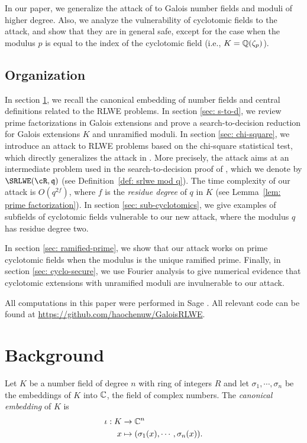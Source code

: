 \documentclass[envcountsect]{llncs}
\begin{document}
In our paper, we generalize the attack of \cite{elos2015weak} to Galois number fields and moduli of higher degree. Also, we analyze the vulnerability of cyclotomic fields to the \cite{elos2015weak} attack, and show that they are in general safe, except for the case when the modulus $p$ is equal to the index of the cyclotomic field (i.e., $K = \mathbb{Q}(\zeta_p)$).


\subsection{Organization}

In section \ref{sec: background}, we recall the canonical embedding of number fields and central definitions related to the RLWE problems. In section \ref{sec: s-to-d}, we review prime factorizations in Galois extensions and prove a search-to-decision reduction for Galois extensions $K$ and unramified moduli. In section \ref{sec: chi-square}, we introduce an attack to RLWE problems based on the chi-square statistical test, which directly generalizes the attack in \cite{elos2015weak}. More precisely, the attack aims at an intermediate problem used in the search-to-decision proof of \cite{lyubashevsky2013ideal}, which we denote by $\SRLWE(\cR,\fq)$ (see Definition~\ref{def: srlwe mod q}). The time complexity of our attack is $O(q^{2f})$, where $f$ is the {\it residue degree} of $q$ in $K$ (see Lemma~\ref{lem: prime factorization}). In section \ref{sec: sub-cyclotomics}, we give examples of subfields of cyclotomic fields vulnerable to our new attack, where the modulus $q$ has residue degree two.

In section \ref{sec: ramified-prime}, we show that our attack works on prime cyclotomic fields when the modulus is the unique ramified prime. Finally, in section \ref{sec: cyclo-secure}, we use Fourier analysis to give numerical evidence that cyclotomic extensions with unramified moduli are invulnerable to our attack.

All computations in this paper were performed in Sage \cite{sage}. All relevant code can be found at \url{https://github.com/haochenuw/GaloisRLWE}.


\section{Background} \label{sec: background}

Let $K$ be a number field of degree $n$ with ring of integers $R$ and let $\sigma_1, \cdots, \sigma_n$ be the embeddings of $K$ into $\mathbb{C}$, the field of complex numbers. The {\it canonical embedding} of $K$ is
\begin{align*}
    \iota: K &\to \mathbb{C}^n \\
     x & \mapsto (\sigma_1(x), \cdots, \sigma_n(x)).
\end{align*}
\end{document}
